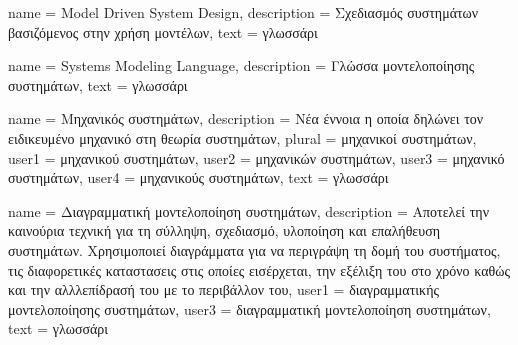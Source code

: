 
	{name			= {Model Driven System Design},
	 description	= {Σχεδιασμός συστημάτων βασιζόμενος στην χρήση μοντέλων},
	 text			= {γλωσσάρι}
	}
	
	{name			= {Systems Modeling Language},
	 description	= {Γλώσσα μοντελοποίησης συστημάτων},
	 text			= {γλωσσάρι}
	}
	
	{name			= {Μηχανικός συστημάτων},
	 description	= {Νέα έννοια η οποία δηλώνει τον ειδικευμένο μηχανικό στη θεωρία συστημάτων},
	 plural			= {μηχανικοί συστημάτων},
	 user1			= {μηχανικού συστημάτων},
	 user2			= {μηχανικών συστημάτων},
	 user3			= {μηχανικό συστημάτων},
	 user4			= {μηχανικούς συστημάτων},
	 text			= {γλωσσάρι}
	}
	
	{name			= {Διαγραμματική μοντελοποίηση συστημάτων},
	 description	= {Αποτελεί την καινούρια τεχνική για τη σύλληψη, σχεδιασμό, υλοποίηση και επαλήθευση συστημάτων. Χρησιμοποιεί διαγράμματα για να περιγράψη τη δομή του συστήματος, τις διαφορετικές καταστασεις στις οποίες εισέρχεται, την εξέλιξη του στο χρόνο καθώς και την αλλλεπίδρασή του με το περιβάλλον του},
	 user1			= {διαγραμματικής μοντελοποίησης συστημάτων},
	 user3			= {διαγραμματική μοντελοποίηση συστημάτων},
	 text			= {γλωσσάρι}
	}